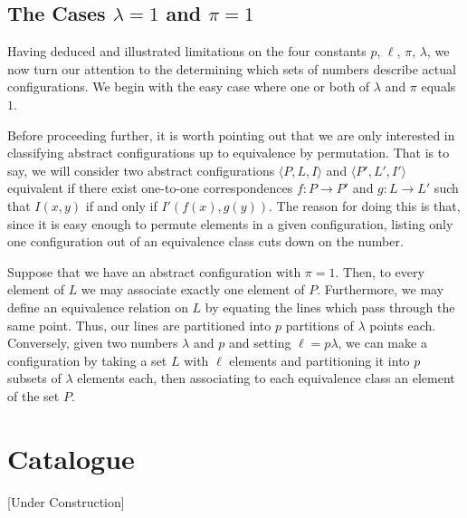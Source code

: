 \documentclass[12pt]{article}
\begin{document}
\subsection{The Cases $\lambda = 1$ and $\pi = 1$}

Having deduced and illustrated limitations on the four constants
$p$, $\ell$, $\pi$, $\lambda$, we now turn our attention to the
determining which sets of numbers describe actual configurations.
We begin with the easy case where one or both of $\lambda$ and 
$\pi$ equals $1$.

Before proceeding further, it is worth pointing out that we are
only interested in classifying abstract configurations up to 
equivalence by permutation.  That is to say, we will consider
two abstract configurations $\langle P, L, I \rangle$ and
$\langle P', L', I' \rangle$ equivalent if there exist one-to-one
correspondences $f \colon P \to P'$ and $g \colon L \to L'$ such
that $I(x,y)$ if and only if $I'(f(x),g(y))$.  The reason for
doing this is that, since it is easy enough to permute elements 
in a given configuration, listing only one configuration out of
an equivalence class cuts down on the number.

Suppose that we have an abstract configuration with $\pi = 1$. 
Then, to every element of $L$ we may associate exactly one
element of $P$.  Furthermore, we may define an equivalence
relation on $L$ by equating the lines which pass through the
same point.  Thus, our lines are partitioned into $p$ partitions
of $\lambda$ points each.  Conversely, given two numbers $\lambda$
and $p$ and setting $\ell = p \lambda$, we can make a 
configuration by taking a set $L$ with $\ell$ elements and
partitioning it into $p$ subsets of $\lambda$ elements each, 
then associating to each equivalence class an element of the 
set $P$.

\section{Catalogue}

[Under Construction]
\end{document}
